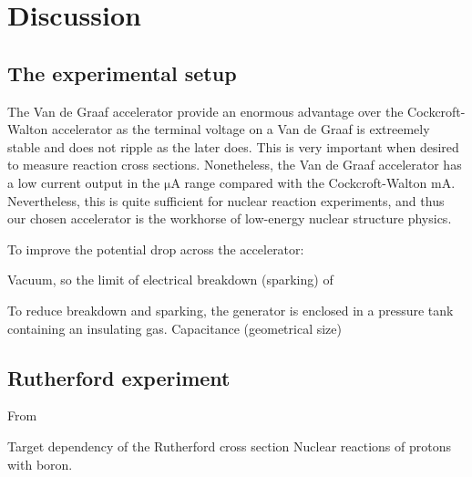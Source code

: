 \section{Discussion}

\subsection{The experimental setup}
The Van de Graaf accelerator provide an enormous advantage over the
Cockcroft-Walton accelerator as the terminal voltage on a Van de Graaf is
extreemely stable and does not ripple as the later does. This is very important
when desired to measure reaction cross sections. Nonetheless, the Van de Graaf
accelerator has a low current output in the $\si{\micro\ampere}$ range compared
with the Cockcroft-Walton $\si{\milli\ampere}$. Nevertheless, this is quite
sufficient for nuclear reaction experiments, and thus our chosen accelerator is
the workhorse of low-energy nuclear structure physics.

To improve the potential drop across the accelerator:

Vacuum, so the limit of electrical breakdown (sparking) of 

To reduce breakdown and sparking, the generator is enclosed in a pressure tank
containing an insulating gas.
Capacitance (geometrical size)
\cite{krane}

\subsection{Rutherford experiment}
From 

Target dependency of the Rutherford cross section
Nuclear reactions of protons with boron.

